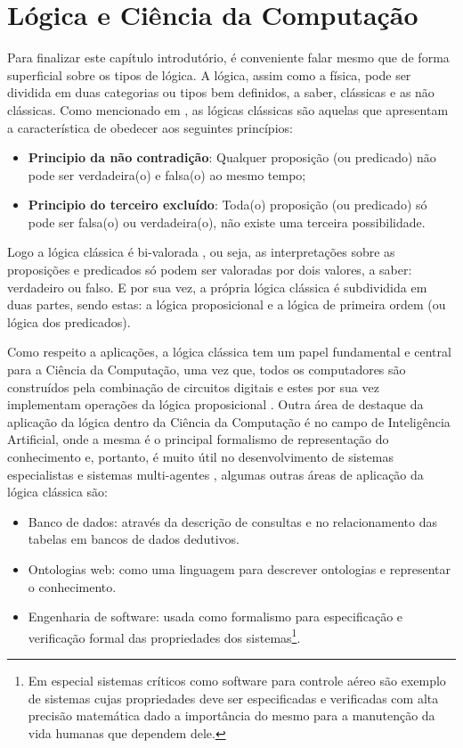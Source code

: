 \section{Lógica e Ciência da Computação}\label{sec:LogicsAndComputation}

Para finalizar este capítulo introdutório, é conveniente falar mesmo que de forma superficial sobre os tipos de lógica. A lógica, assim como a física, pode ser dividida em duas categorias ou tipos bem definidos, a saber, clássicas e as não clássicas. Como mencionado em \cite{benja-Logica, edgar2002}, as lógicas clássicas são aquelas que apresentam a característica de obedecer aos seguintes princípios:

\begin{itemize}
	\item \textbf{Principio da não contradição}: Qualquer proposição (ou predicado) não pode ser verdadeira(o) e falsa(o) ao mesmo tempo;
	\item \textbf{Principio do terceiro excluído}: Toda(o) proposição (ou predicado) só pode ser falsa(o) ou verdadeira(o), não existe uma terceira possibilidade.
\end{itemize}

Logo a lógica clássica é bi-valorada \cite{edgar2002}, ou seja, as interpretações sobre as proposições e predicados só podem ser valoradas por dois valores, a saber: verdadeiro ou falso. E por sua vez, a própria lógica clássica é subdividida em duas partes, sendo estas: a lógica proposicional e a lógica de primeira ordem (ou lógica dos predicados).

Como respeito a aplicações, a lógica clássica tem um papel fundamental e central para a Ciência da Computação, uma vez que, todos os computadores são construídos pela combinação de circuitos digitais e estes por sua vez implementam operações da lógica proposicional \cite{abe2002-logica, nunes2008}. Outra área de destaque da aplicação da lógica dentro da Ciência da Computação é no campo de Inteligência Artificial, onde a mesma é o principal formalismo de representação do conhecimento e, portanto, é muito útil no desenvolvimento de sistemas especialistas e sistemas multi-agentes \cite{benja-Logica}, algumas outras áreas de aplicação da lógica clássica são:

\begin{itemize}
	\item Banco de dados: através da descrição de consultas e no relacionamento das
tabelas em bancos de dados dedutivos.
	\item Ontologias web: como uma linguagem para descrever
ontologias e representar o conhecimento.
	\item Engenharia de software: usada como formalismo para especificação e verificação formal das propriedades dos sistemas\footnote{Em especial sistemas críticos como software para controle aéreo são exemplo de sistemas cujas propriedades deve ser especificadas e verificadas com alta precisão matemática dado a importância do mesmo para a manutenção da vida humanas que dependem dele.}.
\end{itemize}

